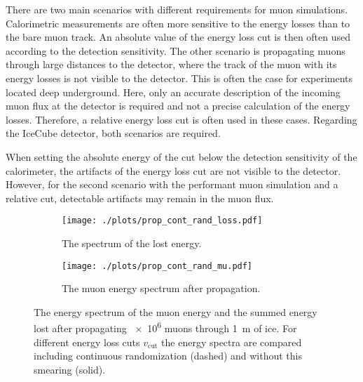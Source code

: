 There are two main scenarios with different requirements for muon simulations.
Calorimetric measurements are often more sensitive to the energy losses than to the bare muon track.
An absolute value of the energy loss cut is then often used according to the detection sensitivity.
The other scenario is propagating muons through large distances to the detector, where the track of the muon with its energy losses is not visible to the detector.
This is often the case for experiments located deep underground.
Here, only an accurate description of the incoming muon flux at the detector is required and not a precise calculation of the energy losses.
Therefore, a relative energy loss cut is often used in these cases.
Regarding the IceCube detector, both scenarios are required.

When setting the absolute energy of the cut below the detection sensitivity of the calorimeter, the artifacts of the energy loss cut are not visible to the detector.
However, for the second scenario with the performant muon simulation and a relative cut, detectable artifacts may remain in the muon flux.
\begin{figure}
    \centering
    \begin{subfigure}{0.9\textwidth}
        \centering
        \texttt{[image: ./plots/prop\_cont\_rand\_loss.pdf]}
        \caption{The spectrum of the lost energy.}
        \label{fig:cont_rand_loss}
        \vspace{0.5cm}
    \end{subfigure}
    \begin{subfigure}{0.9\textwidth}
        \centering
        \texttt{[image: ./plots/prop\_cont\_rand\_mu.pdf]}
        \caption{The muon energy spectrum after propagation.}
        \label{fig:cont_rand_mu}
    \end{subfigure}
    \caption{The energy spectrum of the muon energy and the summed energy lost after propagating \num{e6} muons through \SI{1}{m} of ice. For different energy loss cuts $v_{\text{cut}}$ the energy spectra are compared including continuous randomization (dashed) and without this smearing (solid).}
    \label{fig:cont_rand}
\end{figure}

